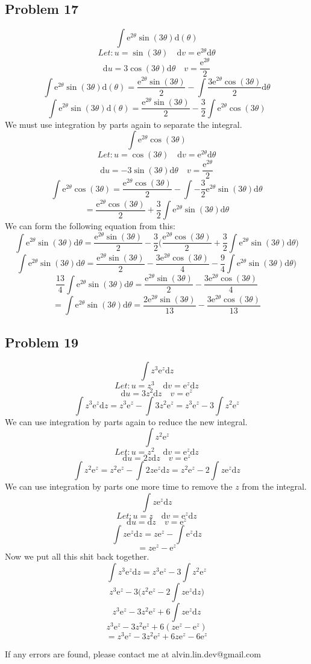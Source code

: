\documentclass[letterpaper, 12pt]{article}
\newcommand*{\diff}{\mathrm{d}}
\newcommand*{\e}{\mathrm{e}}
\begin{document}
\subsection*{Problem 17}
\[ \int{\e^{2\theta}\sin(3\theta)}\diff(\theta) \]
\[ Let: u = \sin(3\theta) \quad \diff{v} = \e^{2\theta}\diff{\theta} \]
\[ \diff{u} = 3\cos(3\theta)\diff{\theta} \quad v = \frac{\e^{2\theta}}{2} \]
\[ \int{\e^{2\theta}\sin(3\theta)}\diff(\theta) =
   \frac{\e^{2\theta}\sin(3\theta)}{2}-
   \int{\frac{3\e^{2\theta}\cos(3\theta)}{2}\diff{\theta}} \]
\[ \int{\e^{2\theta}\sin(3\theta)}\diff(\theta) =
   \frac{\e^{2\theta}\sin(3\theta)}{2}-
   \frac{3}{2}\int{\e^{2\theta}\cos(3\theta)} \]
We must use integration by parts again to separate the integral.
\[ \int{\e^{2\theta}\cos(3\theta)} \]
\[ Let: u = \cos(3\theta) \quad \diff{v} = \e^{2\theta}\diff{\theta} \]
\[ \diff{u} = -3\sin(3\theta)\diff{\theta} \quad v = \frac{\e^{2\theta}}{2} \]
\[ \int{\e^{2\theta}\cos(3\theta)} =
   \frac{\e^{2\theta}\cos(3\theta)}{2}-
   \int{-\frac{3}{2}\e^{2\theta}\sin(3\theta)\diff{\theta}} \]
\[ = \frac{\e^{2\theta}\cos(3\theta)}{2}+\frac{3}{2}
   \int{\e^{2\theta}\sin(3\theta)\diff{\theta}} \]
We can form the following equation from this:
\[ \int{\e^{2\theta}\sin(3\theta)\diff{\theta}} =
   \frac{\e^{2\theta}\sin(3\theta)}{2}-
   \frac{3}{2}\bigg(\frac{\e^{2\theta}\cos(3\theta)}{2}+
   \frac{3}{2}\int{\e^{2\theta}\sin(3\theta)\diff{\theta}}\bigg) \]
\[ \int{\e^{2\theta}\sin(3\theta)\diff{\theta}} =
   \frac{\e^{2\theta}\sin(3\theta)}{2}-
   \frac{3\e^{2\theta}\cos(3\theta)}{4}-
   \frac{9}{4}\int{\e^{2\theta}\sin(3\theta)\diff{\theta}}\bigg) \]
\[ \frac{13}{4}\int{\e^{2\theta}\sin(3\theta)\diff{\theta}} =
   \frac{\e^{2\theta}\sin(3\theta)}{2}-
   \frac{3\e^{2\theta}\cos(3\theta)}{4} \]
\[ = \int{\e^{2\theta}\sin(3\theta)\diff{\theta}} =
\frac{2\e^{2\theta}\sin(3\theta)}{13}-
\frac{3\e^{2\theta}\cos(3\theta)}{13} \]

\subsection*{Problem 19}
\[ \int{z^{3}\e^{z}\diff{z}} \]
\[ Let: u = z^{3} \quad \diff{v} = \e^{z}\diff{z} \]
\[ \diff{u} = 3z^{2}\diff{z} \quad v = \e^{z} \]
\[ \int{z^{3}\e^{z}\diff{z}} =
   z^{3}\e^{z}-\int{3z^{2}\e^{z}} =
   z^{3}\e^{z}-3\int{z^{2}\e^{z}} \]
We can use integration by parts again to reduce the new integral.
\[ \int{z^{2}\e^{z}} \]
\[ Let: u = z^{2} \quad \diff{v} = \e^{z}\diff{z} \]
\[ \diff{u} = 2z\diff{z} \quad v = \e^{z} \]
\[ \int{z^{2}\e^{z}} = z^{2}\e^{z}-\int{2z\e^{z}\diff{z}} =
   z^{2}\e^{z}-2\int{z\e^{z}\diff{z}} \]
We can use integration by parts one more time to remove the \( z \) from the
integral.
\[ \int{z\e^{z}\diff{z}} \]
\[ Let: u = z \quad \diff{v} = \e^{z}\diff{z} \]
\[ \diff{u} = \diff{z} \quad v = \e^{z} \]
\[ \int{z\e^{z}\diff{z}} = z\e^{z}-\int{\e^{z}\diff{z}} \]
\[ = z\e^{z}-\e^{z} \]
Now we put all this shit back together.
\[ \int{z^{3}\e^{z}\diff{z}} =
   z^{3}\e^{z}-3\int{z^{2}\e^{z}} \]
\[ z^{3}\e^{z}-3\bigg(z^{2}\e^{z}-2\int{z\e^{z}\diff{z}}\bigg) \]
\[ z^{3}\e^{z}-3z^{2}\e^{z}+6\int{z\e^{z}\diff{z}} \]
\[ z^{3}\e^{z}-3z^{2}\e^{z}+6(z\e^{z}-\e^{z}) \]
\[ = z^{3}\e^{z}-3z^{2}\e^{z}+6z\e^{z}-6\e^{z} \]

\begin{center}
  If any errors are found, please contact me at alvin.lin.dev@gmail.com
\end{center}
\end{document}
